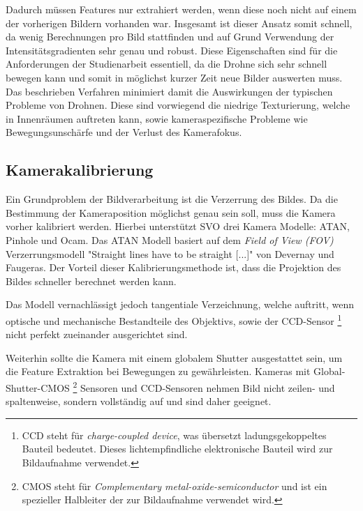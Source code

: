 Dadurch müssen Features nur extrahiert werden, wenn diese noch nicht auf einem der vorherigen Bildern vorhanden war. Insgesamt ist dieser Ansatz somit schnell, da wenig Berechnungen pro Bild stattfinden und auf Grund Verwendung der Intensitätsgradienten sehr genau und robust. \newline
Diese Eigenschaften sind für die Anforderungen der Studienarbeit essentiell, da die Drohne sich sehr schnell bewegen kann und somit in möglichst kurzer Zeit neue Bilder auswerten muss. Das beschrieben Verfahren minimiert damit die Auswirkungen der typischen Probleme von Drohnen. Diese sind vorwiegend die niedrige Texturierung, welche in Innenräumen auftreten kann, sowie kameraspezifische Probleme wie Bewegungsunschärfe und der Verlust des Kamerafokus.


\subsection{Kamerakalibrierung}
Ein Grundproblem der Bildverarbeitung ist die Verzerrung des Bildes. 
Da die Bestimmung der Kameraposition möglichst genau sein soll, muss die Kamera vorher kalibriert werden. \newline
Hierbei unterstützt SVO drei Kamera Modelle: ATAN, Pinhole und Ocam. \cite{svo_cameracalibration} \newline
Das ATAN Modell basiert auf dem \textit{Field of View \emph{(FOV)}} Verzerrungsmodell "Straight lines have to be straight [...]" von Devernay und Faugeras.\newline %
Der Vorteil dieser Kalibrierungsmethode ist, dass die Projektion des Bildes schneller berechnet werden kann. %

Das Modell vernachlässigt jedoch tangentiale Verzeichnung, welche auftritt, wenn optische und mechanische Bestandteile des Objektivs, sowie der CCD-Sensor 
\footnote{CCD steht für \emph{charge-coupled device}, was übersetzt ladungsgekoppeltes Bauteil bedeutet. Dieses lichtempfindliche elektronische Bauteil wird zur Bildaufnahme verwendet.} 
nicht perfekt zueinander ausgerichtet sind. %

Weiterhin sollte die Kamera mit einem globalem Shutter ausgestattet sein, um die Feature Extraktion bei Bewegungen zu gewährleisten. Kameras mit Global-Shutter-CMOS  
\footnote{CMOS steht für \emph{Complementary metal-oxide-semiconductor} und ist ein spezieller Halbleiter der zur Bildaufnahme verwendet wird.} %
Sensoren und CCD-Sensoren nehmen Bild nicht zeilen- und spaltenweise, sondern vollständig auf und sind daher geeignet. \newline

